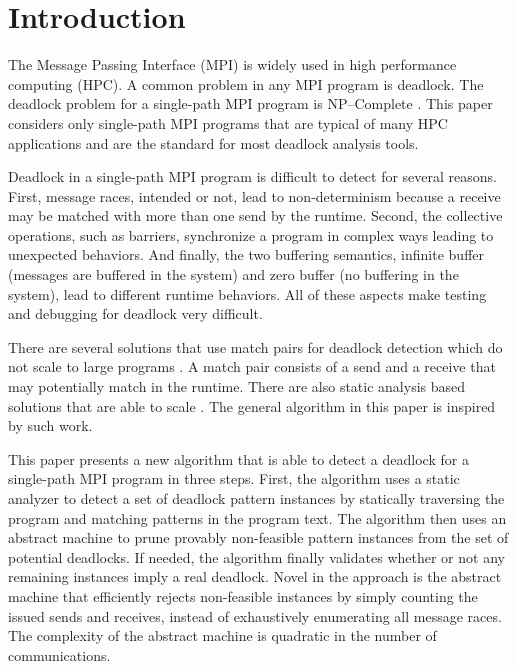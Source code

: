 \section{Introduction}

The Message Passing Interface (MPI) is widely used in high performance computing (HPC). A common problem in any MPI program is deadlock. The deadlock problem for a single-path MPI program is NP--Complete \cite{DBLP:conf/fm/ForejtKNS14}.
This paper considers only single-path MPI programs that are typical of many HPC applications and are the standard for most deadlock analysis tools.  

Deadlock in a single-path MPI program is difficult to detect for several reasons. First, message races, intended or not, lead to non-determinism because a receive may be matched with more than one send by the runtime. Second, the collective operations, such as barriers, synchronize a program in complex ways leading to unexpected behaviors. And finally, the two buffering semantics, infinite buffer (messages are buffered in the system) and zero buffer (no buffering in the system), lead to different runtime behaviors. All of these aspects make testing and debugging for deadlock very difficult. 

There are several solutions that use match pairs for deadlock detection which do not scale to large programs \cite{DBLP:conf/ppopp/VakkalankaSGK08, DBLP:conf/sbmf/SharmaGB12, DBLP:conf/fm/ForejtKNS14}. A match pair consists of a send and a receive that may potentially match in the runtime. There are also static analysis based solutions that are able to scale \cite{DBLP:conf/sc/SharmaGB12, DBLP:conf/pldi/JoshiPSN09, Subodh:Dissertation}. The general algorithm in this paper is inspired by such work.

This paper presents a new algorithm that is able to detect a deadlock for a single-path MPI program in three steps. First, the algorithm uses a static analyzer to detect a set of deadlock pattern instances by statically traversing the program and matching patterns in the program text. The algorithm then uses an abstract machine to prune provably non-feasible pattern instances from the set of potential deadlocks. If needed, the algorithm finally validates whether or not any remaining instances imply a real deadlock. Novel in the approach is the abstract machine that efficiently rejects non-feasible instances by simply counting the issued sends and receives, instead of exhaustively enumerating all message races. The complexity of the abstract machine is quadratic in the number of communications. 

